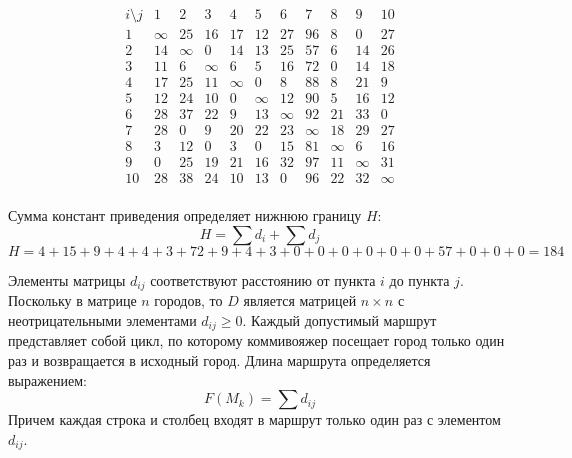 \documentclass{article}
\begin{document}
\[
    \begin{array}{c|cccccccccc}
        i \setminus j & 1      & 2      & 3      & 4      & 5      & 6      & 7      & 8      & 9      & 10     \\
        \hline
        1             & \infty & 25     & 16     & 17     & 12     & 27     & 96     & 8      & 0      & 27     \\
        2             & 14     & \infty & 0      & 14     & 13     & 25     & 57     & 6      & 14     & 26     \\
        3             & 11     & 6      & \infty & 6      & 5      & 16     & 72     & 0      & 14     & 18     \\
        4             & 17     & 25     & 11     & \infty & 0      & 8      & 88     & 8      & 21     & 9      \\
        5             & 12     & 24     & 10     & 0      & \infty & 12     & 90     & 5      & 16     & 12     \\
        6             & 28     & 37     & 22     & 9      & 13     & \infty & 92     & 21     & 33     & 0      \\
        7             & 28     & 0      & 9      & 20     & 22     & 23     & \infty & 18     & 29     & 27     \\
        8             & 3      & 12     & 0      & 3      & 0      & 15     & 81     & \infty & 6      & 16     \\
        9             & 0      & 25     & 19     & 21     & 16     & 32     & 97     & 11     & \infty & 31     \\
        10            & 28     & 38     & 24     & 10     & 13     & 0      & 96     & 22     & 32     & \infty \\
    \end{array}
\]

Сумма констант приведения определяет нижнюю границу $H$:
\[ H = \sum d_i + \sum d_j \]
\[ H = 4 + 15 + 9 + 4 + 4 + 3 + 72 + 9 + 4 + 3 + 0 + 0 + 0 + 0 + 0 + 0 + 57 + 0 + 0 + 0 = 184 \]

Элементы матрицы $d_{ij}$ соответствуют расстоянию от пункта $i$ до пункта $j$. Поскольку в матрице $n$ городов, то $D$ является матрицей $n \times n$ с неотрицательными элементами $d_{ij} \geq 0$. Каждый допустимый маршрут представляет собой цикл, по которому коммивояжер посещает город только один раз и возвращается в исходный город. Длина маршрута определяется выражением:
\[ F(M_k) = \sum d_{ij} \]
Причем каждая строка и столбец входят в маршрут только один раз с элементом $d_{ij}$.
\end{document}
